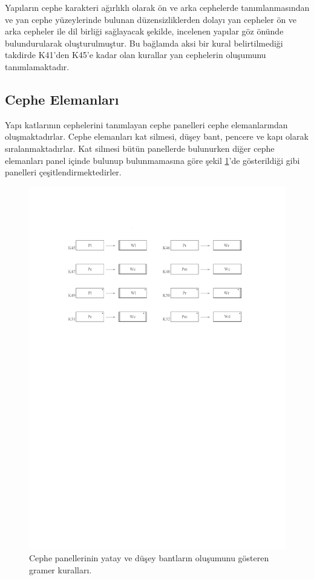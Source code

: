 \documentclass[12pt,turkish,a4paperpaper,]{report}
\begin{document}
Yapıların cephe karakteri ağırlıklı olarak ön ve arka cephelerde
tanımlanmasından ve yan cephe yüzeylerinde bulunan düzensizliklerden
dolayı yan cepheler ön ve arka cepheler ile dil birliği sağlayacak
şekilde, incelenen yapılar göz önünde bulundurularak oluşturulmuştur. Bu
bağlamda aksi bir kural belirtilmediği takdirde K41'den K45'e kadar olan
kurallar yan cephelerin oluşumunu tanımlamaktadır.

\hypertarget{cephe-elemanlarux131}{%
\subsection{Cephe Elemanları}\label{cephe-elemanlarux131}}

Yapı katlarının cephelerini tanımlayan cephe panelleri cephe
elemanlarından oluşmaktadırlar. Cephe elemanları kat silmesi, düşey
bant, pencere ve kapı olarak sıralanmaktadırlar. Kat silmesi bütün
panellerde bulunurken diğer cephe elemanları panel içinde bulunup
bulunmamasına göre şekil \ref{KPaneller}'de gösterildiği gibi panelleri
çeşitlendirmektedirler.

\begin{figure}
\centering
\includegraphics[width=1\textwidth,height=\textheight]{source/figures/KPaneller.pdf}
\caption{Cephe panellerinin yatay ve düşey bantların oluşumunu gösteren
gramer kuralları. \label{KPaneller}}
\end{figure}
\end{document}

